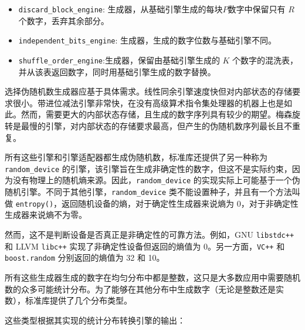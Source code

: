 \begin{itemize}
\item
\verb|discard_block_engine|: 生成器，从基础引擎生成的每块$P$数字中保留只有 $R$个数字，丢弃其余部分。

\item
\verb|independent_bits_engine|: 生成器，生成的数字位数与基础引擎不同。

\item
\verb|shuffle_order_engine|:生成器，保留由基础引擎生成的 $K$ 个数字的混洗表，并从该表返回数字，同时用基础引擎生成的数字替换。
\end{itemize}

选择伪随机数生成器应基于具体需求。线性同余引擎速度快但对内部状态的存储要求很小。带进位减法引擎非常快，在没有高级算术指令集处理器的机器上也是如此。然而，需要更大的内部状态存储，且生成的数字序列具有较少的期望。梅森旋转是最慢的引擎，对内部状态的存储要求最高，但产生的伪随机数序列最长且不重复。

所有这些引擎和引擎适配器都生成伪随机数，标准库还提供了另一种称为 \verb|random_device| 的引擎，该引擎旨在生成非确定性的数字，但这不是实际约束，因为没有物理上的随机熵来源。因此，\verb|random_device| 的实现实际上可能基于一个伪随机引擎。不同于其他引擎，\verb|random_device| 类不能设置种子，并且有一个方法叫做 \verb|entropy()|，返回随机设备的熵，对于确定性生成器来说熵为 0，对于非确定性生成器来说熵不为零。

然而，这不是判断设备是否真正是非确定性的可靠方法。例如，GNU \verb|libstdc++| 和 LLVM \verb|libc++| 实现了非确定性设备但返回的熵值为 0。另一方面，\verb|VC++| 和 \verb|boost.random| 分别返回的熵值为 32 和 10。

所有这些生成器生成的数字在均匀分布中都是整数，这只是大多数应用中需要随机数的众多可能统计分布。为了能够在其他分布中生成数字（无论是整数还是实数），标准库提供了几个分布类型。

这些类型根据其实现的统计分布转换引擎的输出：

